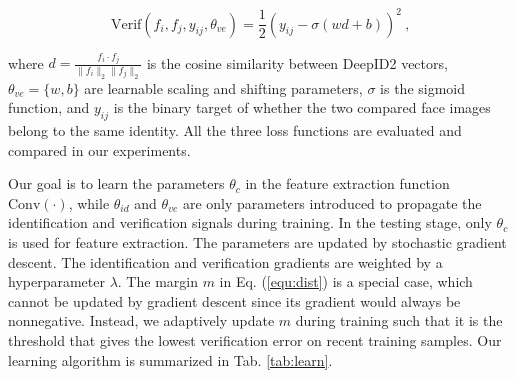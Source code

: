 \documentclass{article} %
\begin{document}
\begin{equation}
\textrm{Verif}(f_i,f_j,y_{ij},\theta_{ve})=\frac{1}{2}\left(y_{ij}-\sigma(wd+b)\right)^2 \ \textrm{,}
\end{equation}

where $d=\frac{f_i\cdot f_j}{\|f_i\|_2\|f_j\|_2}$ is the cosine similarity between DeepID2 vectors, $\theta_{ve}=\{w,b\}$ are learnable scaling and shifting parameters, $\sigma$ is the sigmoid function, and $y_{ij}$ is the binary target of whether the two compared face images belong to the same identity. All the three loss functions are evaluated and compared in our experiments.

Our goal is to learn the parameters $\theta_c$ in the feature extraction function $\textrm{Conv}(\cdot)$, while $\theta_{id}$ and $\theta_{ve}$ are only parameters introduced to propagate the identification and verification signals during training. In the testing stage, only $\theta_c$ is used for feature extraction. The parameters are updated by stochastic gradient descent. The identification and verification gradients are weighted by a hyperparameter $\lambda$. The margin $m$ in Eq. (\ref{equ:dist}) is a special case, which cannot be updated by gradient descent since its gradient would always be nonnegative. Instead, we adaptively update $m$ during training such that it is the threshold that gives the lowest verification error on recent training samples. Our learning algorithm is summarized in Tab. \ref{tab:learn}.
\end{document}
